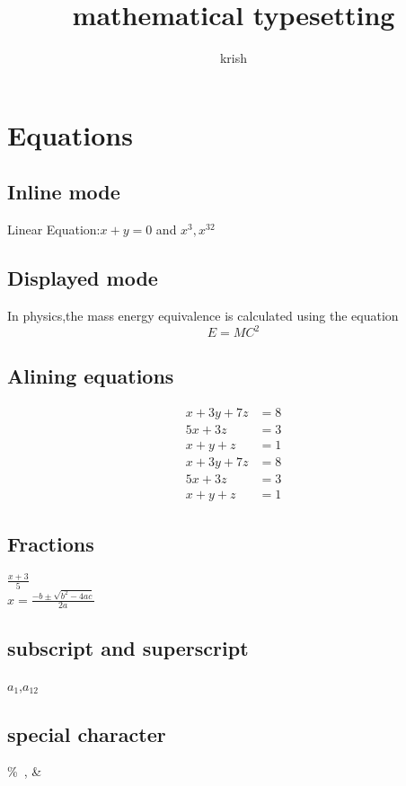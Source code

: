 \documentclass[12pt,openany]{book}
\begin{document}
	\title{mathematical typesetting}
	\author{krish}
	\maketitle
	\chapter{Equations}
	\section{Inline mode}
	Linear Equation:$x+y=0$ and $x^3,x^{32}$
	\section{Displayed mode}
	In physics,the mass energy equivalence is calculated using the equation 
	\begin{equation}
		E=MC^2
	\end{equation}
	\section{Alining equations}
	\begin{align}
		x+3y+7z&=8\\
		5x+3z&=3 \nonumber\\
		x+y+z&=1
	\end{align}
	\begin{align*}
	x+3y+7z&=8\\
	5x+3z&=3\\
	x+y+z&=1
	\end{align*}
	\section{Fractions}
	$\displaystyle\frac{x+3}{5}$ \\
	$\displaystyle x=\frac{-b\pm\sqrt{b^2-4ac}}{2a}$\\
	\section{subscript and superscript}
	$a_1$,$a_{12}$
	\section{special character}
	\%\ , \&\
\end{document}
